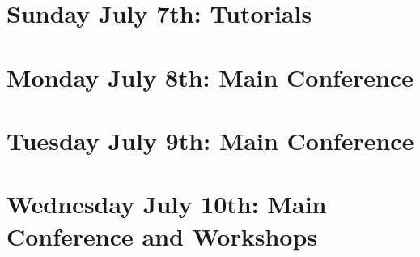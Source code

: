 \documentclass[11pt]{article}
\begin{document}
\newpage
\section{Sunday July 7th: Tutorials}




\newpage
\section{Monday July 8th: Main Conference}




\newpage
\section{Tuesday July 9th: Main Conference}



\newpage
\section{Wednesday July 10th: Main Conference and Workshops}





\newpage


\end{document}
